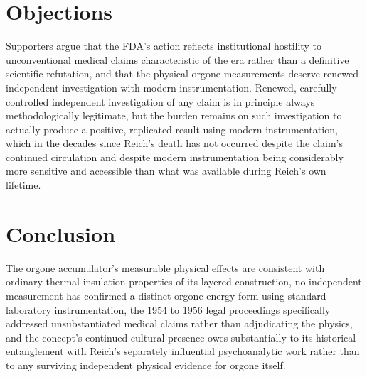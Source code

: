 \documentclass[11pt]{article}
\begin{document}
\section{Objections}

Supporters argue that the FDA's action reflects institutional hostility to unconventional medical claims characteristic of the era rather than a definitive scientific refutation, and that the physical orgone measurements deserve renewed independent investigation with modern instrumentation. Renewed, carefully controlled independent investigation of any claim is in principle always methodologically legitimate, but the burden remains on such investigation to actually produce a positive, replicated result using modern instrumentation, which in the decades since Reich's death has not occurred despite the claim's continued circulation and despite modern instrumentation being considerably more sensitive and accessible than what was available during Reich's own lifetime.

\section{Conclusion}

The orgone accumulator's measurable physical effects are consistent with ordinary thermal insulation properties of its layered construction, no independent measurement has confirmed a distinct orgone energy form using standard laboratory instrumentation, the 1954 to 1956 legal proceedings specifically addressed unsubstantiated medical claims rather than adjudicating the physics, and the concept's continued cultural presence owes substantially to its historical entanglement with Reich's separately influential psychoanalytic work rather than to any surviving independent physical evidence for orgone itself.
\end{document}
